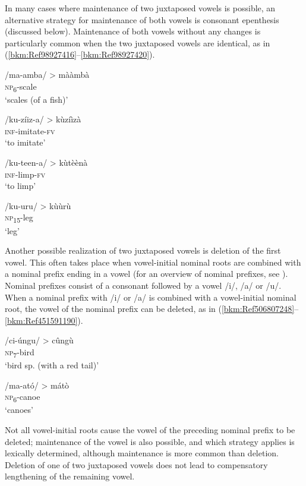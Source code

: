 In many cases where maintenance of two juxtaposed vowels is possible, an alternative strategy for maintenance of both vowels is consonant epenthesis (discussed below). Maintenance of both vowels without any changes is particularly common when the two juxtaposed vowels are identical, as in (\ref{bkm:Ref98927416}--\ref{bkm:Ref98927420}).

\ea
\label{bkm:Ref98927416}
/ma-amba/ > mààmbà\\
\textsc{np}\textsubscript{6}-scale\\
\glt ‘scales (of a fish)’
\z

\ea
/ku-zíiz-a/ > kùzíìzà\\
\textsc{inf}-imitate-\textsc{fv}\\
\glt ‘to imitate’
\z

\ea
/ku-teen-a/ > kùtèènà\\
\textsc{inf}-limp-\textsc{fv}\\
\glt ‘to limp’
\z

\ea
\label{bkm:Ref98927420}
/ku-uru/ > kùùrù\\
\textsc{np}\textsubscript{15}-leg\\
\glt ‘leg’
\z

Another possible realization of two juxtaposed vowels is deletion of the first vowel. This often takes place when vowel-initial nominal roots are combined with a nominal prefix ending in a vowel (for an overview of nominal prefixes, see ). Nominal prefixes con\-sist of a consonant followed by a vowel /i/, /a/ or /u/. When a nominal prefix with /i/ or /a/ is combined with a vowel-initial nominal root, the vowel of the nominal prefix can be deleted, as in (\ref{bkm:Ref506807248}--\ref{bkm:Ref451591190}).

\ea
\label{bkm:Ref506807248}
/ci-úngu/ > cûngù \\
\textsc{np}\textsubscript{7}-bird\\
\glt ‘bird sp. (with a red tail)’
\z

\ea
\label{bkm:Ref451591190}
/ma-ató/ > mátò\\
\textsc{np}\textsubscript{6}-canoe\\
\glt ‘canoes’
\z

Not all vowel-initial roots cause the vowel of the preceding nominal prefix to be deleted; mainte\-nance of the vowel is also possible, and which strategy applies is lexically determined, al\-though maintenance is more common than deletion. Deletion of one of two juxtaposed vowels does not lead to compensatory lengthening of the remaining vowel.

